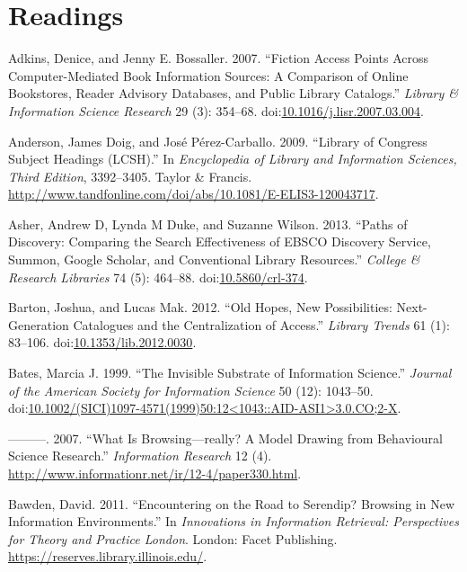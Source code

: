 \documentclass[]{article}
\begin{document}
\section*{Readings}\label{readings}

\hypertarget{refs}{}
\hypertarget{ref-adkinsux5ffictionux5f2007}{}
Adkins, Denice, and Jenny E. Bossaller. 2007. ``Fiction Access Points
Across Computer-Mediated Book Information Sources: A Comparison of
Online Bookstores, Reader Advisory Databases, and Public Library
Catalogs.'' \emph{Library \& Information Science Research} 29 (3):
354--68.
doi:\href{https://doi.org/10.1016/j.lisr.2007.03.004}{10.1016/j.lisr.2007.03.004}.

\hypertarget{ref-andersonux5flibraryux5f2009}{}
Anderson, James Doig, and José Pérez-Carballo. 2009. ``Library of
Congress Subject Headings (LCSH).'' In \emph{Encyclopedia of Library and
Information Sciences, Third Edition}, 3392--3405. Taylor \& Francis.
\url{http://www.tandfonline.com/doi/abs/10.1081/E-ELIS3-120043717}.

\hypertarget{ref-asherux5fpathsux5f2013}{}
Asher, Andrew D, Lynda M Duke, and Suzanne Wilson. 2013. ``Paths of
Discovery: Comparing the Search Effectiveness of EBSCO Discovery
Service, Summon, Google Scholar, and Conventional Library Resources.''
\emph{College \& Research Libraries} 74 (5): 464--88.
doi:\href{https://doi.org/10.5860/crl-374}{10.5860/crl-374}.

\hypertarget{ref-bartonux5foldux5f2012}{}
Barton, Joshua, and Lucas Mak. 2012. ``Old Hopes, New Possibilities:
Next-Generation Catalogues and the Centralization of Access.''
\emph{Library Trends} 61 (1): 83--106.
doi:\href{https://doi.org/10.1353/lib.2012.0030}{10.1353/lib.2012.0030}.

\hypertarget{ref-batesux5finvisibleux5f1999}{}
Bates, Marcia J. 1999. ``The Invisible Substrate of Information
Science.'' \emph{Journal of the American Society for Information
Science} 50 (12): 1043--50.
doi:\href{https://doi.org/10.1002/(SICI)1097-4571(1999)50:12\%3C1043::AID-ASI1\%3E3.0.CO;2-X}{10.1002/(SICI)1097-4571(1999)50:12\textless{}1043::AID-ASI1\textgreater{}3.0.CO;2-X}.

\hypertarget{ref-batesux5fwhatux5f2007}{}
---------. 2007. ``What Is Browsing---really? A Model Drawing from
Behavioural Science Research.'' \emph{Information Research} 12 (4).
\url{http://www.informationr.net/ir/12-4/paper330.html}.

\hypertarget{ref-bawdenux5fencounteringux5f2011}{}
Bawden, David. 2011. ``Encountering on the Road to Serendip? Browsing in
New Information Environments.'' In \emph{Innovations in Information
Retrieval: Perspectives for Theory and Practice London}. London: Facet
Publishing. \url{https://reserves.library.illinois.edu/}.
\end{document}
